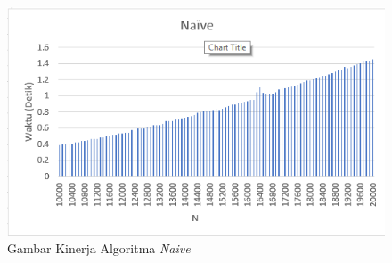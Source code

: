 	\begin{figure}[H]
	\centering
  	\includegraphics[scale=0.7]{images/bab5/banding.png}
  	\caption{Gambar Kinerja Algoritma \textit{Naive}}
  	\label{fig:banding1}
	\end{figure}
